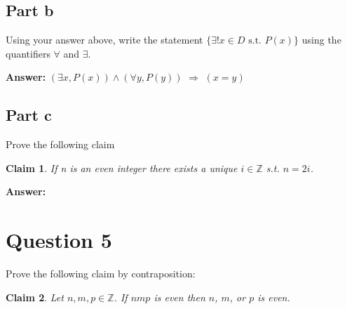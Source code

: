 \documentclass[12pt]{article}
\newtheorem*{claim}{Claim}
\begin{document}
\subsection*{Part b}

Using your answer above, write the statement $\{\exists ! x\in D\text{ s.t. }P(x)\}$ using the quantifiers $\forall$ and $\exists$.\newline

{\noindent\bf Answer:}
{
$(\exists x,P(x)) \land (\forall y,P(y))$ $\Rightarrow$ $(x=y)$
}
\subsection*{Part c}

Prove the following claim
\begin{claim}
If n is an even integer there exists a unique $i\in\mathbb{Z}$ s.t. $n=2i$.
\end{claim}

{\noindent\bf Answer:}

\newpage
\section*{Question 5}

Prove the following claim by contraposition:
\begin{claim}
Let $n,m,p\in\mathbb{Z}$. If $nmp$ is even then $n$, $m$, or $p$ is even.
\end{claim}
\end{document}
